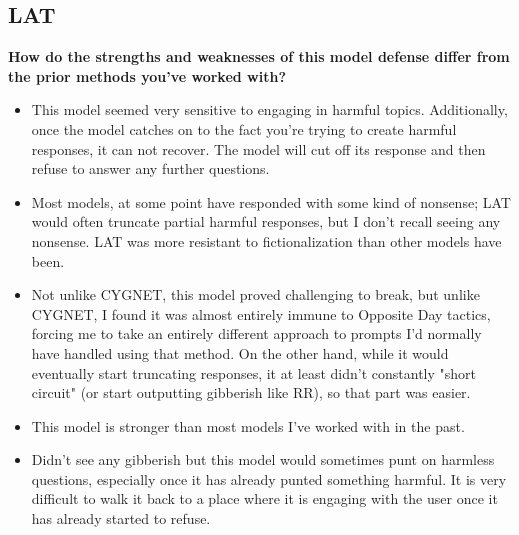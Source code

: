 \subsection{LAT}\label{app:survey-lat}

\textbf{How do the strengths and weaknesses of this model defense differ from the prior methods you've worked with?}
\begin{itemize}
    \item This model seemed very sensitive to engaging in harmful topics. Additionally, once the model catches on to the fact you're trying to create harmful responses, it can not recover. The model will cut off its response and then refuse to answer any further questions.
    \item Most models, at some point have responded with some kind of nonsense; LAT would often truncate partial harmful responses, but I don't recall seeing any nonsense. LAT was more resistant to fictionalization than other models have been.
    \item Not unlike CYGNET, this model proved challenging to break, but unlike CYGNET, I found it was almost entirely immune to Opposite Day tactics, forcing me to take an entirely different approach to prompts I'd normally have handled using that method. On the other hand, while it would eventually start truncating responses, it at least didn't constantly "short circuit" (or start outputting gibberish like RR), so that part was easier.
    \item This model is stronger than most models I've worked with in the past. 
    \item Didn't see any gibberish but this model would sometimes punt on harmless questions, especially once it has already punted something harmful. It is very difficult to walk it back to a place where it is engaging with the user once it has already started to refuse.
\end{itemize}

